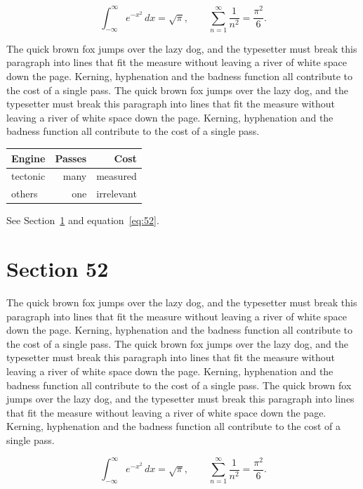\documentclass{article}
\begin{document}
\begin{equation}\label{eq:51}
\int_{-\infty}^{\infty} e^{-x^{2}}\,dx = \sqrt{\pi}, \qquad
\sum_{n=1}^{\infty} \frac{1}{n^{2}} = \frac{\pi^{2}}{6}.
\end{equation}

The quick brown fox jumps over the lazy dog, and the typesetter must break this paragraph into lines that fit the measure without leaving a river of white space down the page. Kerning, hyphenation and the badness function all contribute to the cost of a single pass. The quick brown fox jumps over the lazy dog, and the typesetter must break this paragraph into lines that fit the measure without leaving a river of white space down the page. Kerning, hyphenation and the badness function all contribute to the cost of a single pass. 

\begin{center}
\begin{tabular}{lrr}
\toprule
Engine & Passes & Cost \\
\midrule
tectonic & many & measured \\
others & one & irrelevant \\
\bottomrule
\end{tabular}
\end{center}

See Section~\ref{sec:52} and equation~\eqref{eq:52}.
\section{Section 52}
\label{sec:52}
The quick brown fox jumps over the lazy dog, and the typesetter must break this paragraph into lines that fit the measure without leaving a river of white space down the page. Kerning, hyphenation and the badness function all contribute to the cost of a single pass. The quick brown fox jumps over the lazy dog, and the typesetter must break this paragraph into lines that fit the measure without leaving a river of white space down the page. Kerning, hyphenation and the badness function all contribute to the cost of a single pass. The quick brown fox jumps over the lazy dog, and the typesetter must break this paragraph into lines that fit the measure without leaving a river of white space down the page. Kerning, hyphenation and the badness function all contribute to the cost of a single pass. 

\begin{equation}\label{eq:52}
\int_{-\infty}^{\infty} e^{-x^{2}}\,dx = \sqrt{\pi}, \qquad
\sum_{n=1}^{\infty} \frac{1}{n^{2}} = \frac{\pi^{2}}{6}.
\end{equation}
\end{document}
